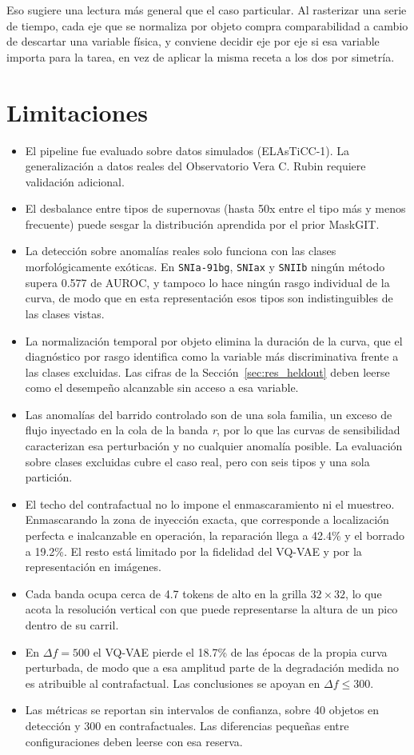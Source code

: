 Eso sugiere una lectura más general que el caso particular. Al rasterizar una serie de tiempo, cada eje que se normaliza por objeto compra comparabilidad a cambio de descartar una variable física, y conviene decidir eje por eje si esa variable importa para la tarea, en vez de aplicar la misma receta a los dos por simetría.

\section{Limitaciones}

\begin{itemize}
    \item El pipeline fue evaluado sobre datos simulados (ELAsTiCC-1). La generalización a datos reales del Observatorio Vera C. Rubin requiere validación adicional.
    \item El desbalance entre tipos de supernovas (hasta 50x entre el tipo más y menos frecuente) puede sesgar la distribución aprendida por el prior MaskGIT.
    \item La detección sobre anomalías reales solo funciona con las clases morfológicamente exóticas. En \texttt{SNIa-91bg}, \texttt{SNIax} y \texttt{SNIIb} ningún método supera 0.577 de AUROC, y tampoco lo hace ningún rasgo individual de la curva, de modo que en esta representación esos tipos son indistinguibles de las clases vistas.
    \item La normalización temporal por objeto elimina la duración de la curva, que el diagnóstico por rasgo identifica como la variable más discriminativa frente a las clases excluidas. Las cifras de la Sección~\ref{sec:res_heldout} deben leerse como el desempeño alcanzable sin acceso a esa variable.
    \item Las anomalías del barrido controlado son de una sola familia, un exceso de flujo inyectado en la cola de la banda \textit{r}, por lo que las curvas de sensibilidad caracterizan esa perturbación y no cualquier anomalía posible. La evaluación sobre clases excluidas cubre el caso real, pero con seis tipos y una sola partición.
    \item El techo del contrafactual no lo impone el enmascaramiento ni el muestreo. Enmascarando la zona de inyección exacta, que corresponde a localización perfecta e inalcanzable en operación, la reparación llega a 42.4\% y el borrado a 19.2\%. El resto está limitado por la fidelidad del VQ-VAE y por la representación en imágenes.
    \item Cada banda ocupa cerca de 4.7 tokens de alto en la grilla $32 \times 32$, lo que acota la resolución vertical con que puede representarse la altura de un pico dentro de su carril.
    \item En $\Delta f = 500$ el VQ-VAE pierde el 18.7\% de las épocas de la propia curva perturbada, de modo que a esa amplitud parte de la degradación medida no es atribuible al contrafactual. Las conclusiones se apoyan en $\Delta f \leq 300$.
    \item Las métricas se reportan sin intervalos de confianza, sobre 40 objetos en detección y 300 en contrafactuales. Las diferencias pequeñas entre configuraciones deben leerse con esa reserva.
\end{itemize}

